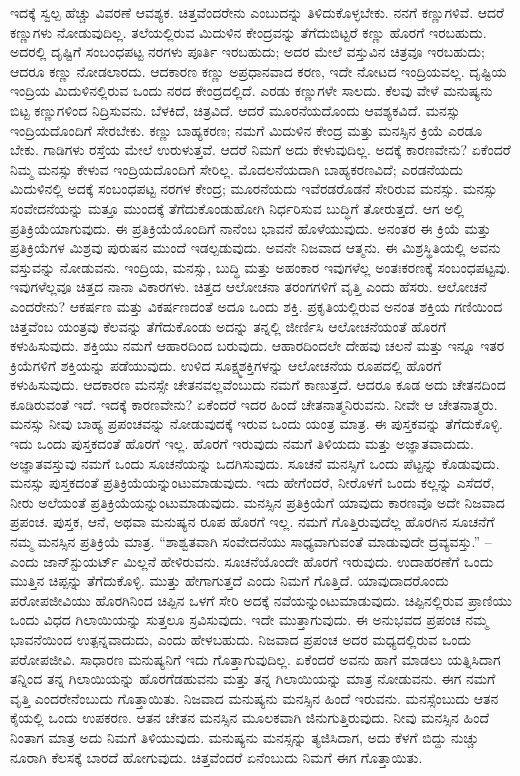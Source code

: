 ಇದಕ್ಕೆ ಸ್ವಲ್ಪ ಹೆಚ್ಚು ವಿವರಣೆ ಆವಶ್ಯಕ. ಚಿತ್ತವೆಂದರೇನು ಎಂಬುದನ್ನು ತಿಳಿದುಕೊಳ್ಳಬೇಕು. ನನಗೆ ಕಣ್ಣುಗಳಿವೆ. ಆದರೆ ಕಣ್ಣುಗಳು ನೋಡುವುದಿಲ್ಲ. ತಲೆಯಲ್ಲಿರುವ ಮಿದುಳಿನ ಕೇಂದ್ರವನ್ನು ತೆಗೆದುಬಿಟ್ಟರೆ ಕಣ್ಣು ಹೊರಗೆ ಇರಬಹುದು. ಅದರಲ್ಲಿ ದೃಷ್ಟಿಗೆ ಸಂಬಂಧಪಟ್ಟ ನರಗಳು ಪೂರ್ತಿ ಇರಬಹುದು; ಅದರ ಮೇಲೆ ವಸ್ತುವಿನ ಚಿತ್ರವೂ ಇರಬಹುದು; ಆದರೂ ಕಣ್ಣು ನೋಡಲಾರದು. ಆದಕಾರಣ ಕಣ್ಣು ಅಪ್ರಧಾನವಾದ ಕರಣ, ಇದೇ ನೋಟದ ಇಂದ್ರಿಯವಲ್ಲ. ದೃಷ್ಟಿಯ ಇಂದ್ರಿಯ ಮಿದುಳಿನಲ್ಲಿರುವ ಒಂದು ನರದ ಕೇಂದ್ರದಲ್ಲಿದೆ. ಎರಡು ಕಣ್ಣುಗಳೇ ಸಾಲದು. ಕೆಲವು ವೇಳೆ ಮನುಷ್ಯನು ಬಿಟ್ಟ ಕಣ್ಣುಗಳಿಂದ ನಿದ್ರಿಸುವನು. ಬೆಳಕಿದೆ, ಚಿತ್ರವಿದೆ. ಆದರೆ ಮೂರನೆಯದೊಂದು ಆವಶ್ಯಕವಿದೆ. ಮನಸ್ಸು ಇಂದ್ರಿಯದೊಂದಿಗೆ ಸೇರಬೇಕು. ಕಣ್ಣು ಬಾಹ್ಯಕರಣ; ನಮಗೆ ಮಿದುಳಿನ ಕೇಂದ್ರ ಮತ್ತು ಮನಸ್ಸಿನ ಕ್ರಿಯೆ ಎರಡೂ ಬೇಕು. ಗಾಡಿಗಳು ರಸ್ತೆಯ ಮೇಲೆ ಉರುಳುತ್ತವೆ. ಆದರೆ ನಿಮಗೆ ಅದು ಕೇಳುವುದಿಲ್ಲ. ಅದಕ್ಕೆ ಕಾರಣವೇನು? ಏಕೆಂದರೆ ನಿಮ್ಮ ಮನಸ್ಸು ಕೇಳುವ ಇಂದ್ರಿಯದೊಂದಿಗೆ ಸೇರಿಲ್ಲ. ಮೊದಲನೆಯದಾಗಿ ಬಾಹ್ಯಕರಣವಿದೆ; ಎರಡನೆಯದು ಮಿದುಳಿನಲ್ಲಿ ಅದಕ್ಕೆ ಸಂಬಂಧಪಟ್ಟ ನರಗಳ ಕೇಂದ್ರ; ಮೂರನೆಯದು ಇವೆರಡರೊಡನೆ ಸೇರಿರುವ ಮನಸ್ಸು. ಮನಸ್ಸು ಸಂವೇದನೆಯನ್ನು ಮತ್ತೂ ಮುಂದಕ್ಕೆ ತೆಗೆದುಕೊಂಡುಹೋಗಿ ನಿರ್ಧರಿಸುವ ಬುದ್ಧಿಗೆ ತೋರುತ್ತದೆ. ಆಗ ಅಲ್ಲಿ ಪ್ರತಿಕ್ರಿಯೆಯಾಗುವುದು. ಈ ಪ್ರತಿಕ್ರಿಯೆಯೊಂದಿಗೆ ನಾನೆಂಬ ಭಾವನೆ ಹೊಳೆಯುವುದು. ಅನಂತರ ಈ ಕ್ರಿಯೆ ಮತ್ತು ಪ್ರತಿಕ್ರಿಯೆಗಳ ಮಿಶ್ರವು ಪುರುಷನ ಮುಂದೆ ಇಡಲ್ಪಡುವುದು. ಅವನೇ ನಿಜವಾದ ಆತ್ಮನು. ಈ ಮಿಶ್ರಸ್ಥಿತಿಯಲ್ಲಿ ಅವನು ವಸ್ತುವನ್ನು ನೋಡುವನು. ಇಂದ್ರಿಯ, ಮನಸ್ಸು, ಬುದ್ಧಿ ಮತ್ತು ಅಹಂಕಾರ ಇವುಗಳೆಲ್ಲ ಅಂತಃಕರಣಕ್ಕೆ ಸಂಬಂಧಪಟ್ಟವು. ಇವುಗಳೆಲ್ಲವೂ ಚಿತ್ತದ ನಾನಾ ವಿಕಾರಗಳು. ಚಿತ್ತದ ಆಲೋಚನಾ ತರಂಗಗಳಿಗೆ ವೃತ್ತಿ ಎಂದು ಹೆಸರು. ಆಲೋಚನೆ ಎಂದರೇನು? ಆಕರ್ಷಣ ಮತ್ತು ವಿಕರ್ಷಣದಂತೆ ಅದೂ ಒಂದು ಶಕ್ತಿ. ಪ್ರಕೃತಿಯಲ್ಲಿರುವ ಅನಂತ ಶಕ್ತಿಯ ಗಣಿಯಿಂದ ಚಿತ್ತವೆಂಬ ಯಂತ್ರವು ಕೆಲವನ್ನು ತೆಗೆದುಕೊಂಡು ಅದನ್ನು ತನ್ನಲ್ಲಿ ಜೀರ್ಣಿಸಿ ಆಲೋಚನೆಯಂತೆ ಹೊರಗೆ ಕಳುಹಿಸುವುದು. ಶಕ್ತಿಯು ನಮಗೆ ಆಹಾರದಿಂದ ಬರುವುದು. ಆಹಾರದಿಂದಲೇ ದೇಹವು ಚಲನೆ ಮತ್ತು ಇನ್ನೂ ಇತರ ಕ್ರಿಯೆಗಳಿಗೆ ಶಕ್ತಿಯನ್ನು ಪಡೆಯುವುದು. ಉಳಿದ ಸೂಕ್ಷ್ಮಶಕ್ತಿಗಳನ್ನು ಆಲೋಚನೆಯ ರೂಪದಲ್ಲಿ ಹೊರಗೆ ಕಳುಹಿಸುವುದು. ಆದಕಾರಣ ಮನಸ್ಸೇ ಚೇತನವಲ್ಲವೆಂಬುದು ನಮಗೆ ಕಾಣುತ್ತದೆ. ಆದರೂ ಕೂಡ ಅದು ಚೇತನದಿಂದ ಕೂಡಿರುವಂತೆ ಇದೆ. ಇದಕ್ಕೆ ಕಾರಣವೇನು? ಏಕೆಂದರೆ ಇದರ ಹಿಂದೆ ಚೇತನಾತ್ಮನಿರುವನು. ನೀವೇ ಆ ಚೇತನಾತ್ಮರು. ಮನಸ್ಸು ನೀವು ಬಾಹ್ಯ ಪ್ರಪಂಚವನ್ನು ನೋಡುವುದಕ್ಕೆ ಇರುವ ಒಂದು ಯಂತ್ರ ಮಾತ್ರ. ಈ ಪುಸ್ತಕವನ್ನು ತೆಗೆದುಕೊಳ್ಳಿ. ಇದು ಒಂದು ಪುಸ್ತಕದಂತೆ ಹೊರಗೆ ಇಲ್ಲ. ಹೊರಗೆ ಇರುವುದು ನಮಗೆ ತಿಳಿಯದು ಮತ್ತು ಅಜ್ಞಾತವಾದುದು. ಅಜ್ಞಾತವಸ್ತುವು ನಮಗೆ ಒಂದು ಸೂಚನೆಯನ್ನು ಒದಗಿಸುವುದು. ಸೂಚನೆ ಮನಸ್ಸಿಗೆ ಒಂದು ಪೆಟ್ಟನ್ನು ಕೊಡುವುದು. ಮನಸ್ಸು ಪುಸ್ತಕದಂತೆ ಪ್ರತಿಕ್ರಿಯೆಯನ್ನುಂಟುಮಾಡುವುದು. ಇದು ಹೇಗೆಂದರೆ, ನೀರೊಳಗೆ ಒಂದು ಕಲ್ಲನ್ನು ಎಸೆದರೆ, ನೀರು ಅಲೆಯಂತೆ ಪ್ರತಿಕ್ರಿಯೆಯನ್ನುಂಟುಮಾಡುವುದು. ಮನಸ್ಸಿನ ಪ್ರತಿಕ್ರಿಯೆಗೆ ಯಾವುದು ಕಾರಣವೊ ಅದೇ ನಿಜವಾದ ಪ್ರಪಂಚ. ಪುಸ್ತಕ, ಆನೆ, ಅಥವಾ ಮನುಷ್ಯನ ರೂಪ ಹೊರಗೆ ಇಲ್ಲ. ನಮಗೆ ಗೊತ್ತಿರುವುದೆಲ್ಲ ಹೊರಗಿನ ಸೂಚನೆಗೆ ನಮ್ಮ ಮನಸ್ಸಿನ ಪ್ರತಿಕ್ರಿಯೆ ಮಾತ್ರ. “ಶಾಶ್ವತವಾಗಿ ಸಂವೇದನೆಯು ಸಾಧ್ಯವಾಗುವಂತೆ ಮಾಡುವುದೇ ದ್ರವ್ಯವಸ್ತು.” –ಎಂದು ಜಾನ್​ಸ್ಟುಯರ್ಟ್​ ಮಿಲ್ಲನೆ ಹೇಳಿರುವನು. ಸೂಚನೆಯೊಂದೇ ಹೊರಗೆ ಇರುವುದು. ಉದಾಹರಣೆಗೆ ಒಂದು ಮುತ್ತಿನ ಚಿಪ್ಪನ್ನು ತೆಗೆದುಕೊಳ್ಳಿ. ಮುತ್ತು ಹೇಗಾಗುತ್ತದೆ ಎಂದು ನಿಮಗೆ ಗೊತ್ತಿದೆ. ಯಾವುದಾದರೊಂದು ಪರೋಪಜೀವಿಯು ಹೊರಗಿನಿಂದ ಚಿಪ್ಪಿನ ಒಳಗೆ ಸೇರಿ ಅದಕ್ಕೆ ನವೆಯನ್ನುಂಟುಮಾಡುವುದು. ಚಿಪ್ಪಿನಲ್ಲಿರುವ ಪ್ರಾಣಿಯು ಒಂದು ವಿಧದ ಗಿಲಾಯಿಯನ್ನು ಸುತ್ತಲೂ ಸ್ರವಿಸುವುದು. ಇದೇ ಮುತ್ತಾಗುವುದು. ಈ ಅನುಭವದ ಪ್ರಪಂಚ ನಮ್ಮ ಭಾವನೆಯಿಂದ ಉತ್ಪನ್ನವಾದುದು, ಎಂದು ಹೇಳಬಹುದು. ನಿಜವಾದ ಪ್ರಪಂಚ ಅದರ ಮಧ್ಯದಲ್ಲಿರುವ ಒಂದು ಪರೋಪಜೀವಿ. ಸಾಧಾರಣ ಮನುಷ್ಯನಿಗೆ ಇದು ಗೊತ್ತಾಗುವುದಿಲ್ಲ. ಏಕೆಂದರೆ ಅವನು ಹಾಗೆ ಮಾಡಲು ಯತ್ನಿಸಿದಾಗ ತನ್ನಿಂದ ತನ್ನ ಗಿಲಾಯಿಯನ್ನು ಹೊರಗೆಡಹುವನು ಮತ್ತು ತನ್ನ ಗಿಲಾಯಿಯನ್ನು ಮಾತ್ರ ನೋಡುವನು. ಈಗ ನಮಗೆ ವೃತ್ತಿ ಎಂದರೇನೆಂಬುದು ಗೊತ್ತಾಯಿತು. ನಿಜವಾದ ಮನುಷ್ಯನು ಮನಸ್ಸಿನ ಹಿಂದೆ ಇರುವನು. ಮನಸ್ಸೆಂಬುದು ಆತನ ಕೈಯಲ್ಲಿ ಒಂದು ಉಪಕರಣ. ಆತನ ಚೇತನ ಮನಸ್ಸಿನ ಮೂಲಕವಾಗಿ ಜಿನುಗುತ್ತಿರುವುದು. ನೀವು ಮನಸ್ಸಿನ ಹಿಂದೆ ನಿಂತಾಗ ಮಾತ್ರ ಅದು ನಿಮಗೆ ತಿಳಿಯುವುದು. ಮನುಷ್ಯನು ಮನಸ್ಸನ್ನು ತ್ಯಜಿಸಿದಾಗ, ಅದು ಕೆಳಗೆ ಬಿದ್ದು ನುಚ್ಚು ನೂರಾಗಿ ಕೆಲಸಕ್ಕೆ ಬಾರದೆ ಹೋಗುವುದು. ಚಿತ್ತವೆಂದರೆ ಏನೆಂಬುದು ನಿಮಗೆ ಈಗ ಗೊತ್ತಾಯಿತು. 